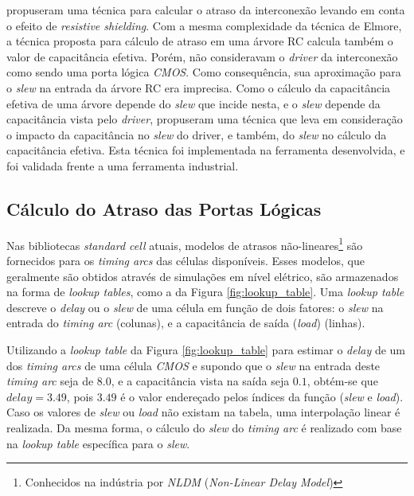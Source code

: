 \documentclass[
	12pt,				%
	openright,			%
	twoside,			%
	a4paper,			%
	english,			%
	french,				%
	spanish,			%
	brazil,				%
	]{abntex2}
\begin{document}
 propuseram uma técnica para calcular o atraso da interconexão levando em conta o efeito de \textit{resistive shielding}. Com a mesma complexidade da técnica de Elmore, a técnica proposta para cálculo de atraso em uma árvore RC calcula também o valor de capacitância efetiva. Porém,  não consideravam o \textit{driver} da interconexão como sendo uma porta lógica \textit{CMOS}. Como consequência, sua aproximação para o \textit{slew} na entrada da árvore RC era imprecisa. Como o cálculo da capacitância efetiva de uma árvore depende do \textit{slew} que incide nesta, e o \textit{slew} depende da capacitância vista pelo \textit{driver},  propuseram uma técnica que leva em consideração o impacto da capacitância no \textit{slew} do driver, e também, do \textit{slew} no cálculo da capacitância efetiva. Esta técnica foi implementada na ferramenta desenvolvida, e foi validada frente a uma ferramenta industrial.

\subsection{Cálculo do Atraso das Portas Lógicas}
Nas bibliotecas \textit{standard cell} atuais, modelos de atrasos não-lineares\footnote{Conhecidos na indústria por \textit{NLDM} (\textit{Non-Linear Delay Model})} são fornecidos para os \textit{timing arcs} das células disponíveis. Esses modelos, que geralmente são obtidos através de simulações em nível elétrico, são armazenados na forma de \textit{lookup tables}, como a da Figura \ref{fig:lookup_table}. Uma \textit{lookup table} descreve o \textit{delay} ou o \textit{slew} de uma célula em função de dois fatores: o \textit{slew} na entrada do \textit{timing arc} (colunas), e a capacitância de saída (\textit{load}) (linhas).

Utilizando a \textit{lookup table} da Figura \ref{fig:lookup_table} para estimar o \textit{delay} de um dos \textit{timing arcs} de uma célula \textit{CMOS} e supondo que o \textit{slew} na entrada deste \textit{timing arc} seja de $8.0$, e a capacitância vista na saída seja $0.1$, obtém-se que $delay = 3.49$, pois $3.49$ é o valor endereçado pelos índices da função (\textit{slew} e \textit{load}). Caso os valores de \textit{slew} ou \textit{load} não existam na tabela, uma interpolação linear é realizada. Da mesma forma, o cálculo do \textit{slew} do \textit{timing arc} é realizado com base na \textit{lookup table} específica para o \textit{slew}.
\end{document}
